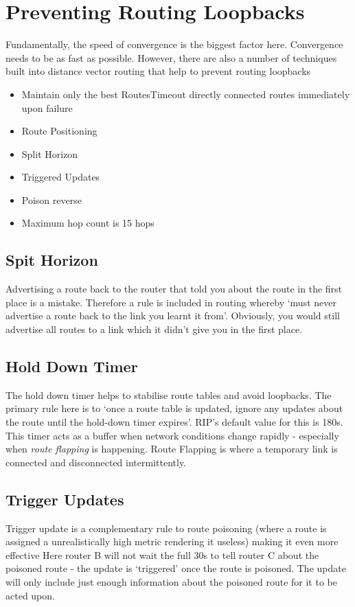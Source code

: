\section{Preventing Routing Loopbacks}
Fundamentally, the speed of convergence is the biggest factor here. Convergence needs to be as fast as possible. However, there are also a number of techniques built into distance vector routing that help to prevent routing loopbacks
\begin{itemize}
    \item Maintain only the best RoutesTimeout directly connected routes immediately upon failure
    \item Route Positioning
    \item Split Horizon 
    \item Triggered Updates
    \item Poison reverse
    \item Maximum hop count is 15 hops
\end{itemize}

\subsection{Spit Horizon}
Advertising a route back to the router that told you about the route in the first place is a mistake. Therefore a rule is included in routing whereby `must never advertise a route back to the link you learnt it from'. Obviously, you would still advertise all routes to a link which it didn't give you in the first place. 

\subsection{Hold Down Timer}
The hold down timer helps to stabilise route tables and avoid loopbacks. The primary rule here is to `once a route table is updated, ignore any updates about the route until the hold-down timer expires'. RIP's default value for this is 180s. This timer acts as a buffer when network conditions change rapidly - especially when \textit{route flapping} is happening. Route Flapping is where a temporary link is connected and disconnected intermittently. 

\subsection{Trigger Updates}
Trigger update is a complementary rule to route poisoning (where a route is assigned a unrealistically high metric rendering it useless) making it even more effective Here router B will not wait the full 30s to tell router C about the poisoned route - the update is `triggered' once the route is poisoned. The update will only include just enough information about the poisoned route for it to be acted upon. 